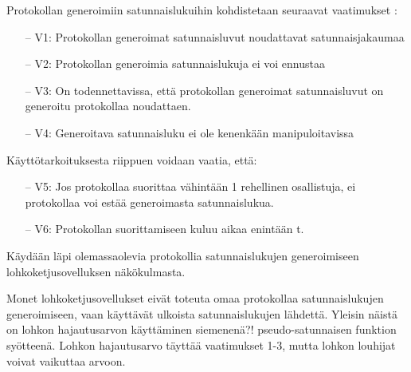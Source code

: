 \documentclass{article}
\begin{document}
Protokollan generoimiin satunnaislukuihin kohdistetaan seuraavat vaatimukset \cite{simic_review_2020}:
\begin{itemize}
    \item[--] V1: Protokollan generoimat satunnaisluvut noudattavat satunnaisjakaumaa
    \item[--] V2: Protokollan generoimia satunnaislukuja ei voi ennustaa
    \item[--] V3: On todennettavissa, että protokollan generoimat satunnaisluvut on generoitu protokollaa noudattaen.
    \item[--] V4: Generoitava satunnaisluku ei ole kenenkään manipuloitavissa
\end{itemize}
Käyttötarkoituksesta riippuen voidaan vaatia, että:

\begin{itemize}
    \item[--] V5: Jos protokollaa suorittaa vähintään 1 rehellinen osallistuja, ei protokollaa voi estää generoimasta satunnaislukua.
    \item[--] V6: Protokollan suorittamiseen kuluu aikaa enintään t.
\end{itemize}

Käydään läpi olemassaolevia protokollia satunnaislukujen generoimiseen lohkoketjusovelluksen näkökulmasta. 

Monet lohkoketjusovellukset eivät toteuta omaa protokollaa satunnaislukujen generoimiseen, vaan käyttävät ulkoista satunnaislukujen lähdettä. Yleisin näistä on lohkon hajautusarvon käyttäminen siemenenä?! pseudo-satunnaisen funktion syötteenä. Lohkon hajautusarvo täyttää vaatimukset 1-3, mutta lohkon louhijat voivat vaikuttaa arvoon.



\end{document}
